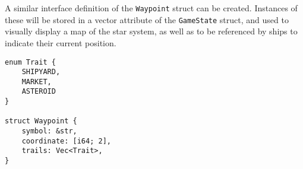 A similar interface definition of the \texttt{Waypoint} struct can be created. Instances of these will be stored in a vector attribute of the \texttt{GameState} struct, and used to visually display a map of the star system, as well as to be referenced by ships to indicate their current position.

\begin{lstlisting}
enum Trait {
    SHIPYARD,
    MARKET,
    ASTEROID
}

struct Waypoint {
    symbol: &str,
    coordinate: [i64; 2],
    trails: Vec<Trait>,
}
\end{lstlisting}